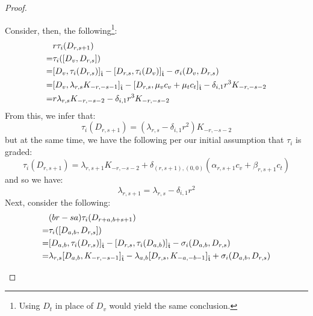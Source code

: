 \begin{proof}
\begin{enumerate}
                    Consider, then, the following\footnote{Using $D_t$ in place of $D_v$ would yield the same conclusion.}:
                        $$
                            \begin{aligned}
                                & r \tau_i(D_{r, s + 1})
                                \\
                                = & \tau_i([D_v, D_{r, s}])
                                \\
                                = & [D_v, \tau_i(D_{r, s})]_{\extendedtoroidal} - [D_{r, s}, \tau_i(D_v)]_{\extendedtoroidal} - \sigma_i(D_v, D_{r, s})
                                \\
                                = & [D_v, \lambda_{r, s} K_{-r, -s - 1}]_{\extendedtoroidal} - [D_{r, s}, \mu_v c_v + \mu_t c_t]_{\extendedtoroidal} - \delta_{i, 1} r^3 K_{-r, -s - 2}
                                \\
                                = & r \lambda_{r, s} K_{-r, -s - 2} - \delta_{i, 1} r^3 K_{-r, -s - 2}
                            \end{aligned}
                        $$
                    From this, we infer that:
                        $$\tau_i(D_{r, s + 1}) = (\lambda_{r, s} - \delta_{i, 1} r^2) K_{-r, -s - 2}$$
                    but at the same time, we have the following per our initial assumption that $\tau_i$ is graded:
                        $$\tau_i(D_{r, s + 1}) = \lambda_{r, s + 1} K_{-r, -s - 2} + \delta_{(r, s + 1), (0, 0)} ( \alpha_{r, s + 1} c_v + \beta_{r, s + 1} c_t )$$
                    and so we have:
                        $$\lambda_{r, s + 1} = \lambda_{r, s} - \delta_{i, 1} r^2$$
                    Next, consider the following:
                        $$
                            \begin{aligned}
                                & (br - sa) \tau_i(D_{r + a, b + s + 1})
                                \\
                                = & \tau_i( [D_{a, b}, D_{r, s}] )
                                \\
                                = & [D_{a, b}, \tau_i(D_{r, s})]_{\extendedtoroidal} - [D_{r, s}, \tau_i(D_{a, b})]_{\extendedtoroidal} - \sigma_i(D_{a, b}, D_{r, s})
                                \\
                                = & \lambda_{r, s} [D_{a, b}, K_{-r, -s - 1}]_{\extendedtoroidal} - \lambda_{a, b} [D_{r, s}, K_{-a, -b - 1}]_{\extendedtoroidal} + \sigma_i(D_{a, b}, D_{r, s})

\end{aligned}$$
\end{enumerate}
\end{proof}

